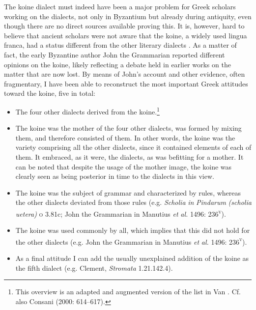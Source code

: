 The koine dialect must indeed have been a major problem for Greek scholars working on the dialects, not only in Byzantium but already during antiquity, even though there are no direct sources available proving this. It is, however, hard to believe that ancient scholars were not aware that the koine, a widely used lingua franca, had a status different from the other literary dialects \citep{Consani2000}. As a matter of fact, the early Byzantine author John the Grammarian reported different opinions on the koine, likely reflecting a debate held in earlier works on the matter that are now lost. By means of John’s account and other evidence, often fragmentary, I have been able to reconstruct the most important Greek attitudes toward the koine, five in total:

\begin{itemize}
\item 
The four other dialects derived from the koine.\footnote{This overview is an adapted and augmented version of the list in Van \citet[209]{Rooy2016b}. Cf. also Consani (2000: 614–617).}

\item 
The koine was the mother of the four other dialects, was formed by mixing them, and therefore consisted of them. In other words, the koine was the variety comprising all the other dialects, since it contained elements of each of them. It embraced, as it were, the dialects, as was befitting for a mother. It can be noted that despite the usage of the mother image, the koine was clearly seen as being posterior in time to the dialects in this view.

\item 
The koine was the subject of grammar and characterized by rules, whereas the other dialects deviated from those rules (e.g. \textit{Scholia} \textit{in} \textit{Pindarum} \textit{(scholia} \textit{uetera)} \textsc{o} 3.81c; John the Grammarian in Manutius \textit{et} \textit{al.} 1496: 236\textsc{\textsuperscript{v}}).

\item 
The koine was used commonly by all, which implies that this did not hold for the other dialects (e.g. John the Grammarian in Manutius \textit{et} \textit{al.} 1496: 236\textsc{\textsuperscript{v}}).

\item 
As a final attitude I can add the usually unexplained addition of the koine as the fifth dialect (e.g. Clement, \textit{Stromata} 1.21.142.4).

\end{itemize}

